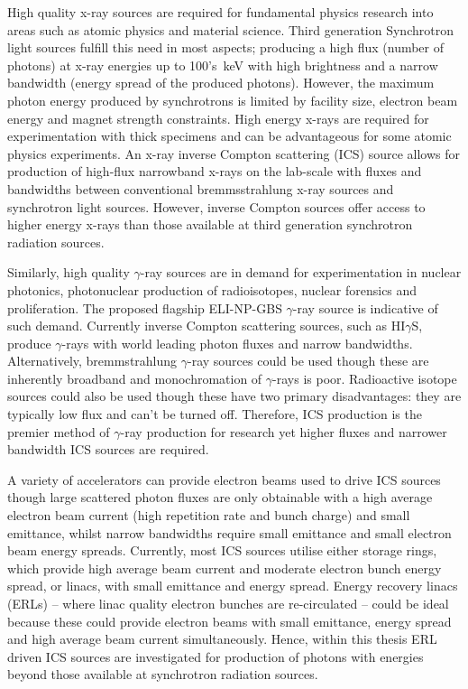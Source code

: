 \documentclass[11pt,oneside]{thesisformat}
\begin{document}
High quality x-ray sources are required for fundamental physics research into areas such as atomic physics and material science. Third generation Synchrotron light sources fulfill this need in most aspects; producing a high flux (number of photons) at x-ray energies up to 100's~\si{\kilo\electronvolt} with high brightness and a narrow bandwidth (energy spread of the produced photons). However, the maximum photon energy produced by synchrotrons is limited by facility size, electron beam energy and magnet strength constraints. High energy x-rays are required for experimentation with thick specimens and can be advantageous for some atomic physics experiments. %
An x-ray inverse Compton scattering (ICS) source allows for production of high-flux narrowband x-rays on the lab-scale with fluxes and bandwidths between conventional bremmsstrahlung x-ray sources and synchrotron light sources. However, inverse Compton sources offer access to higher energy x-rays than those available at third generation synchrotron radiation sources. 

Similarly, high quality $\gamma$-ray sources are in demand for experimentation in nuclear photonics, photonuclear production of radioisotopes, nuclear forensics and proliferation. The proposed flagship ELI-NP-GBS $\gamma$-ray source is indicative of such demand. Currently inverse Compton scattering sources, such as HI$\gamma$S, produce $\gamma$-rays with world leading photon fluxes and narrow bandwidths. Alternatively, bremmstrahlung $\gamma$-ray sources could be used though these are inherently broadband and monochromation of $\gamma$-rays is poor. Radioactive isotope sources could also be used though these have two primary disadvantages: they are typically low flux and can't be turned off. Therefore, ICS production is the premier method of $\gamma$-ray production for research yet higher fluxes and narrower bandwidth ICS sources are required.

A variety of accelerators can provide electron beams used to drive ICS sources though large scattered photon fluxes are only obtainable with a high average electron beam current (high repetition rate and bunch charge) and small emittance, whilst narrow bandwidths require small emittance and small electron beam energy spreads. Currently, most ICS sources utilise either storage rings, which provide high average beam current and moderate electron bunch energy spread, or linacs, with small emittance and energy spread. Energy recovery linacs (ERLs) -- where linac quality electron bunches are re-circulated --  could be ideal because these could provide electron beams with small emittance, energy spread and high average beam current simultaneously. Hence, within this thesis ERL driven ICS sources are investigated for production of photons with energies beyond those available at synchrotron radiation sources.      
\end{document}
